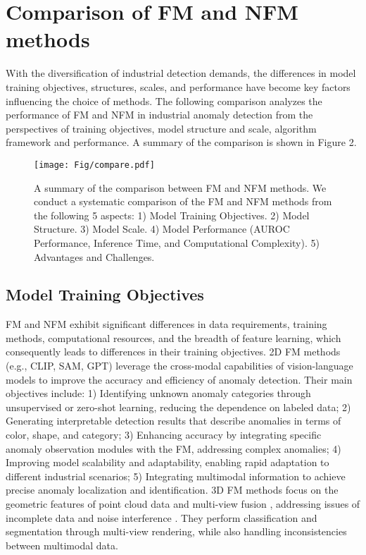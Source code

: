 \documentclass[journal,comsoc]{IEEEtran}
\begin{document}
\section{Comparison of FM and NFM methods}

With the diversification of industrial detection demands, the differences in model training objectives, structures, scales, and performance have become key factors influencing the choice of methods. The following comparison analyzes the performance of FM and NFM in industrial anomaly detection from the perspectives of training objectives, model structure and scale, algorithm framework and performance. A summary of the comparison is shown in Figure 2.

\begin{figure*}[t]
    \centering
    \texttt{[image: Fig/compare.pdf]}
    \caption{A summary of the comparison between FM and NFM methods. We conduct a systematic comparison of the FM and NFM methods from the following 5 aspects: 1) Model Training Objectives. 2) Model Structure. 3) Model Scale. 4) Model Performance (AUROC Performance, Inference Time, and Computational Complexity). 5) Advantages and Challenges.}
\end{figure*}


\subsection{Model Training Objectives}
FM and NFM exhibit significant differences in data requirements, training methods, computational resources, and the breadth of feature learning, which consequently leads to differences in their training objectives. 2D FM methods (e.g., CLIP, SAM, GPT) leverage the cross-modal capabilities\cite{liu2024speech,tu2025self,li2024learning} of vision-language models to improve the accuracy and efficiency of anomaly detection. Their main objectives include:
1) Identifying unknown anomaly categories through unsupervised or zero-shot learning, reducing the dependence on labeled data; 2) Generating interpretable detection results that describe anomalies in terms of color, shape, and category; 3) Enhancing accuracy by integrating specific anomaly observation modules with the FM, addressing complex anomalies; 4) Improving model scalability and adaptability, enabling rapid adaptation to different industrial scenarios; 5) Integrating multimodal information to achieve precise anomaly localization and identification. 
3D FM methods focus on the geometric features of point cloud data \cite{arav2024evaluating,ye2024po3ad} and multi-view fusion \cite{hao2024network}, addressing issues of incomplete data and noise interference \cite{dai2017scannet,uy2019revisiting}. They perform classification and segmentation through multi-view rendering, while also handling inconsistencies between multimodal data. 
\end{document}
